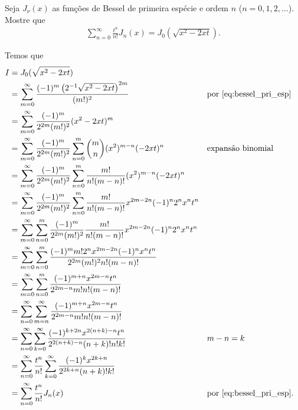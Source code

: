 \documentclass[a4paper,12pt, leqno, answers]{exam}
\begin{document}
\begin{questions}
    \question[P2 de 2011, E de 2011] Seja $J_\nu(x)$ as fun\c{c}\~{o}es de Bessel de primeira esp\'{e}cie e ordem $n$ ($n = 0, 1, 2, \ldots$). Mostre que
    \begin{align*}
        \sum_{n = 0}^\infty \frac{t^n}{n!} J_n(x) = J_0(\sqrt{x^2 - 2xt}).
    \end{align*}
    \begin{solution}
        Temos que
        \begin{align*}
            I &= J_0(\sqrt{x^2 - 2 x t}) \\
            &= \sum_{m = 0}^\infty \frac{(-1)^m \left( 2^{-1} \sqrt{x^2 - 2 x t} \right)^{2m}}{(m!)^2} && \text{por \eqref{eq:bessel_pri_esp}} \\
            &= \sum_{m = 0}^\infty \frac{(-1)^m}{2^{2m} (m!)^2} (x^2 - 2x t)^m \\
            &= \sum_{m = 0}^\infty \frac{(-1)^m}{2^{2m} (m!)^2} \sum_{n = 0}^m \binom{m}{n} (x^2)^{m - n} (-2 x t)^n && \text{expans\~{a}o binomial} \\
            &= \sum_{m = 0}^\infty \frac{(-1)^m}{2^{2m} (m!)^2} \sum_{n = 0}^m \frac{m!}{n! (m - n)!} (x^2)^{m - n} (-2 x t)^n \\
            &= \sum_{m = 0}^\infty \frac{(-1)^m}{2^{2m} (m!)^2} \sum_{n = 0}^m \frac{m!}{n! (m - n)!} x^{2m - 2n} (-1)^n 2^n x^n t^n \\
            &= \sum_{m = 0}^\infty \sum_{n = 0}^m \frac{(-1)^m}{2^{2m} (m!)^2} \frac{m!}{n! (m - n)!} x^{2m - 2n} (-1)^n 2^n x^n t^n \\
            &= \sum_{m = 0}^\infty \sum_{n = 0}^m \frac{(-1)^m m! 2^n x^{2m - 2n} (-1)^n x^n t^n}{2^{2m} (m!)^2 n! (m - n)!} \\
            &= \sum_{m = 0}^\infty \sum_{n = 0}^m \frac{(-1)^{m + n} x^{2m - n} t^n}{2^{2m - n} m! n! (m - n)!} \\
            &= \sum_{n = 0}^\infty \sum_{m = n}^\infty \frac{(-1)^{m + n} x^{2m - n} t^n}{2^{2m - n} m! n! (m - n)!} \\
            &= \sum_{n = 0}^\infty \sum_{k = 0}^\infty \frac{(-1)^{k + 2n} x^{2(n + k) - n} t^n}{2^{2(n + k) - n} (n + k)! n! k!} && m - n = k \\
            &= \sum_{n = 0}^\infty \frac{t^n}{n!} \sum_{k = 0}^\infty \frac{(-1)^{k} x^{2k + n}}{2^{2k + n} (n + k)! k!} \\
            &= \sum_{n = 0}^\infty \frac{t^n}{n!} J_n(x) && \text{por \eqref{eq:bessel_pri_esp}}.
        \end{align*}
    \end{solution}


\end{questions}
\end{document}
